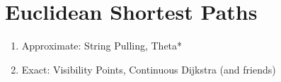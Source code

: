\section{Euclidean Shortest Paths}
\label{cha::lit::euclidean}

\begin{enumerate}
\item{Approximate: String Pulling, Theta*}
\item{Exact: Visibility Points, Continuous Dijkstra (and friends)}
\end{enumerate}

